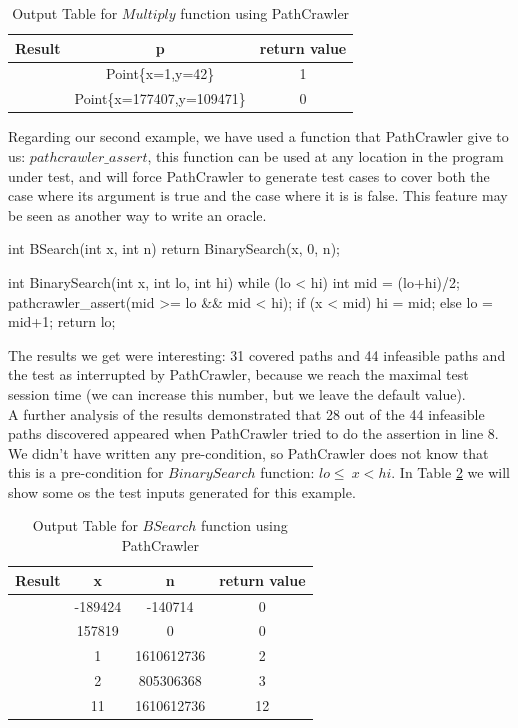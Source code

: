 \documentclass[10pt, conference, compsocconf]{IEEEtran}
\newcommand{\checkK}{\color{ForestGreen}\checkmark}
\begin{document}
\begin{table}[!ht]
\renewcommand{\arraystretch}{1.3}
\setlength{\tabcolsep}{10pt}
\caption{Output Table for $Multiply$ function using PathCrawler}
\label{tab:mul}
\centering
\noindent \begin{tabular}{|c|c|c|}\hline
Result & p & return value\\\hline
\checkK & Point\{x=1,y=42\} & 1 \\\hline
\checkK & Point\{x=177407,y=109471\} & 0 \\\hline
\end{tabular}
\end{table}

Regarding our second example, we have used a function that PathCrawler give to us: $pathcrawler\_assert$, this function can be used at any location in the
program under test, and will force PathCrawler to generate test cases to cover both the case where its argument is true and the case where it is is false.
This feature may be seen as another way to write an oracle.

\begin{code}
int BSearch(int x, int n) {
    return BinarySearch(x, 0, n); 
}
	
int BinarySearch(int x, int lo, int hi) {
    while (lo < hi) {
        int mid = (lo+hi)/2;
        pathcrawler_assert(mid >= lo && mid < hi);
        if (x < mid) { hi = mid; }
		else { lo = mid+1; }
    }
    return lo; 
}
\end{code}

The results we get were interesting: 31 covered paths and 44 infeasible paths and the test as interrupted by PathCrawler,
because we reach the maximal test session time (we can increase this number, but we leave the default value).\\
A further analysis of the results demonstrated that 28 out of the 44 infeasible paths discovered appeared when PathCrawler tried to
do the assertion in line 8. We didn't have written any pre-condition, so PathCrawler does not know that this is a pre-condition
for $BinarySearch$ function:  $lo\leq~x<hi$. In Table \ref{tab:bsearch} we will show some os the test inputs generated for this example.

\begin{table}[!ht]
\renewcommand{\arraystretch}{1.3}
\caption{Output Table for $BSearch$ function using PathCrawler}
\label{tab:bsearch}
\centering
\noindent \begin{tabular}{|c|c|c|c|}\hline
Result & x & n & return value \\\hline
\checkK & -189424 & -140714 & 0 \\\hline
\checkK & 157819 & 0 & 0 \\\hline
\checkK & 1 & 1610612736 & 2 \\\hline
\checkK & 2 & 805306368 & 3 \\\hline
\checkK & 11 & 1610612736 & 12 \\\hline
\end{tabular}
\end{table}
\end{document}
